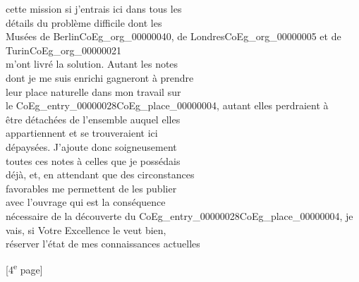 \documentclass{book}
\begin{document}
{\begin{paracol}{2}
cette mission si j’entrais ici dans tous les\\
détails du problème difficile dont les\\
Musées de Berlin\gls{CoEg_org_00000040}, de Londres\gls{CoEg_org_00000005} et de Turin\gls{CoEg_org_00000021}\\
m’ont livré la solution. Autant les notes\\
dont je me suis enrichi gagneront à prendre\\
leur place naturelle dans mon travail sur\\
le \Gls{CoEg_entry_00000028}\gls{CoEg_place_00000004}, autant elles perdraient à\\
être détachées de l’ensemble auquel elles\\
appartiennent et se trouveraient ici\\
dépaysées. J’ajoute donc soigneusement\\
toutes ces notes à celles que je possédais\\
déjà, et, en attendant que des circonstances\\
favorables me permettent de les publier\\
avec l’ouvrage qui est la conséquence\\
nécessaire de la découverte du \Gls{CoEg_entry_00000028}\gls{CoEg_place_00000004}, je\\
vais, si Votre Excellence le veut bien,\\
réserver l’état de mes connaissances actuelles
\end{paracol}

{\footnotesize\begin{center} {[4\textsuperscript{e} page]}\end{center}}

}
\end{document}
